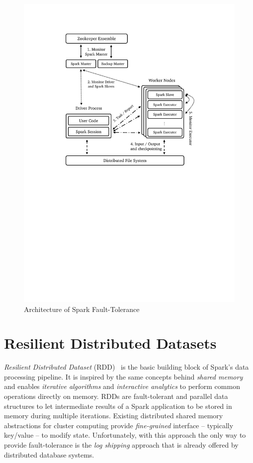 \begin{description}[leftmargin=0pt]
\begin{figure}[H]
        \includegraphics[clip,trim=4cm 13.6cm 4cm 2.9cm,scale=0.9]{spark-full.pdf}
        \caption[Architecture of Spark Fault-Tolerance]{Architecture of Spark Fault-Tolerance\footnotemark}
        \label{fig:spark-full}
    \end{figure}
\end{description}

\section{Resilient Distributed Datasets}
\label{sp:rdd}
\emph{Resilient Distributed Dataset} (RDD)~\cite{Zaharia:2012} is the basic building block of Spark's data processing pipeline. It is inspired by the same concepts behind \emph{shared memory} and enables \emph{iterative algorithms} and \emph{interactive analytics} to perform common operations directly on memory. RDDs are fault-tolerant and parallel data structures to let intermediate results of a Spark application to be stored in memory during multiple iterations. Existing distributed shared memory abstractions for cluster computing provide \emph{fine-grained} interface -- typically key/value -- to modify state. Unfortunately, with this approach the only way to provide fault-tolerance is the \emph{log shipping} approach that is already offered by distributed database systems.

